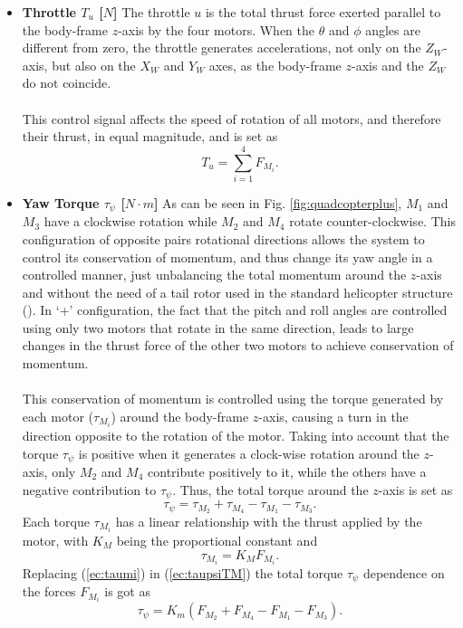 \begin{itemize}
\item \textbf{Throttle $T_u$ [$N$]}
The throttle $u$ is the total thrust force exerted parallel to the body-frame $z$-axis by the four motors. When the $\theta$ and $\phi$ angles are different from zero, the throttle generates accelerations, not only on the $Z_W$-axis, but also on the $X_W$ and $Y_W$ axes, as the body-frame $z$-axis and the $Z_W$ do not coincide.
\\\\
This control signal affects the speed of rotation of all motors, and therefore their thrust, in equal magnitude, and is set as
\begin{equation}
\label{ec:u+}
T_u = \sum_{i=1}^{4}F_{M_i}.
\end{equation}

\item \textbf{Yaw Torque $\tau_{\psi}$ [$N\cdot m$]}
As can be seen in Fig. \ref{fig:quadcopterplus}, $M_1$ and $M_3$ have a clockwise rotation while $M_2$ and $M_4$ rotate counter-clockwise. This configuration of opposite pairs rotational directions allows the system to control its conservation of momentum, and thus change its yaw angle in a controlled manner, just unbalancing the total momentum around the $z$-axis and without the need of a tail rotor used in the standard helicopter structure (\cite{Bresciani2008}). In `+' configuration, the fact that the pitch and roll angles are controlled using only two motors that rotate in the same direction, leads to large changes in the thrust force of the other two motors to achieve conservation of momentum.
\\\\
This conservation of momentum is controlled using the torque generated by each motor ($\tau_{M_i}$) around the body-frame $z$-axis, causing a turn in the direction opposite to the rotation of the motor. Taking into account that the torque $\tau_\psi$ is positive when it generates a clock-wise rotation around the $z$-axis, only $M_2$ and $M_4$ contribute positively to it, while the others have a negative contribution to $\tau_\psi$. Thus, the total torque around the $z$-axis is set as
\begin{equation}
\label{ec:taupsiTM}
\tau_{\psi} = \tau_{M_2} + \tau_{M_4} - \tau_{M_1} - \tau_{M_3}.
\end{equation}
Each torque $\tau_{M_i}$ has a linear relationship with the thrust applied by the motor, with $K_M$ being the proportional constant and
\begin{equation}
\label{ec:taumi}
\tau_{M_{i}} = K_{M}F_{M_i}.
\end{equation}
Replacing (\ref{ec:taumi}) in (\ref{ec:taupsiTM}) the total torque $\tau_\psi$ dependence on the forces $F_{M_i}$ is got as
\begin{equation}
\label{ec:taupsi+}
\tau_{\psi} = K_{m}(F_{M_2} + F_{M_4} - F_{M_1} - F_{M_3}).
\end{equation}


\end{itemize}
